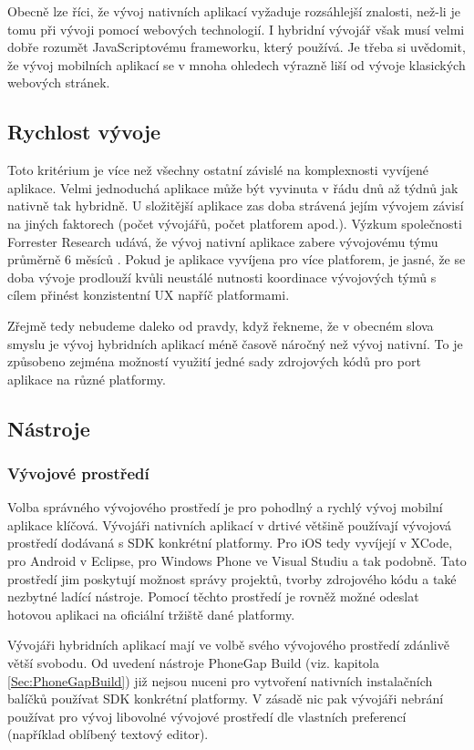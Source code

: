 Obecně lze říci, že vývoj nativních aplikací vyžaduje rozsáhlejší znalosti, než-li je tomu při vývoji pomocí webových technologií. I hybridní vývojář však musí velmi dobře rozumět JavaScriptovému frameworku, který používá. Je třeba si uvědomit, že vývoj mobilních aplikací se v mnoha ohledech výrazně liší od vývoje klasických webových stránek.

\subsection{Rychlost vývoje}
Toto kritérium je více než všechny ostatní závislé na komplexnosti vyvíjené aplikace. Velmi jednoduchá aplikace může být vyvinuta v řádu dnů až týdnů jak nativně tak hybridně. U složitější aplikace zas doba strávená jejím vývojem závisí na jiných faktorech (počet vývojářů, počet platforem apod.). Výzkum společnosti Forrester Research udává, že vývoj nativní aplikace zabere vývojovému týmu průměrně 6 měsíců \cite{mrc_native_wrong_choice}. Pokud je aplikace vyvíjena pro více platforem, je jasné, že se doba vývoje prodlouží kvůli neustálé nutnosti koordinace vývojových týmů s cílem přinést konzistentní UX napříč platformami.

Zřejmě tedy nebudeme daleko od pravdy, když řekneme, že v obecném slova smyslu je vývoj hybridních aplikací méně časově náročný než vývoj nativní. To je způsobeno zejména možností využití jedné sady zdrojových kódů pro port aplikace na různé platformy.

\subsection{Nástroje}
\subsubsection{Vývojové prostředí}
Volba správného vývojového prostředí je pro pohodlný a rychlý vývoj mobilní aplikace klíčová. Vývojáři nativních aplikací v drtivé většině používají vývojová prostředí dodávaná s SDK konkrétní platformy. Pro iOS tedy vyvíjejí v XCode, pro Android v Eclipse, pro Windows Phone ve Visual Studiu a tak podobně. Tato prostředí jim poskytují možnost správy projektů, tvorby zdrojového kódu a také nezbytné ladící nástroje. Pomocí těchto prostředí je rovněž možné odeslat hotovou aplikaci na oficiální tržiště dané platformy.

Vývojáři hybridních aplikací mají ve volbě svého vývojového prostředí zdánlivě větší svobodu. Od uvedení nástroje PhoneGap Build (viz. kapitola \ref{Sec:PhoneGapBuild}) již nejsou nuceni pro vytvoření nativních instalačních balíčků používat SDK konkrétní platformy. V zásadě nic pak vývojáři nebrání používat pro vývoj libovolné vývojové prostředí dle vlastních preferencí (například oblíbený textový editor).

